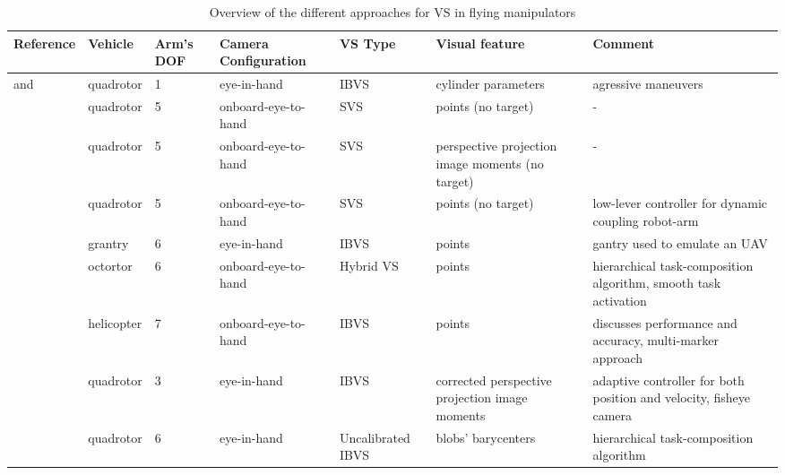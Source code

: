 \renewcommand{\tabularxcolumn}[1]{>{\scriptsize}m{#1}}

\begin{table}
\setlength\extrarowheight{0.3pt} %
	\begin{tabularx}{\textwidth}{CPPBPCC}
		\toprule
		\textbf{Reference} & \textbf{Vehicle} & \textbf{Arm's DOF} & \textbf{Camera Configuration} & \textbf{VS Type} & \textbf{Visual feature} & \textbf{Comment} \\ 
		\midrule
		\cite{thomas_toward_2014} and \cite{thomas_visual_2016} & quadrotor  & 1 & eye-in-hand & IBVS & cylinder parameters & agressive maneuvers \\ 
		\cite{mebarki_image-based_2014} & quadrotor  & 5 & onboard-eye-to-hand  & SVS & points (no target) & - \\ 
		\cite{mebarki_exploiting_2013}  & quadrotor  & 5 & onboard-eye-to-hand  & SVS & perspective projection image moments (no target) & - \\ 
		\cite{mebarki_cross-coupled_2014} & quadrotor  & 5 & onboard-eye-to-hand  & SVS & points (no target) & low-lever controller for dynamic coupling robot-arm \\ 
		\cite{danko_evaluation_2014} & grantry & 6 & eye-in-hand & IBVS & points & gantry used to emulate an UAV \\ 
		\cite{lippiello_hybrid_2016} & octortor & 6 & onboard-eye-to-hand  & Hybrid VS & points & hierarchical task-composition algorithm, smooth task activation \\
		\cite{laiacker_high_2016} & helicopter & 7 & onboard-eye-to-hand  & IBVS & points & discusses performance and accuracy, multi-marker approach \\ 
		\cite{kim_vision-guided_2016} & quadrotor  & 3 & eye-in-hand & IBVS  & corrected perspective projection image moments & adaptive controller for both position and velocity, fisheye camera \\ 
		\cite{santamaria-navarro_uncalibrated_2017} & quadrotor  & 6 & eye-in-hand & Uncalibrated IBVS & blobs' barycenters & hierarchical task-composition algorithm \\
		\bottomrule
	\end{tabularx}
	\caption{Overview of the different approaches for VS in flying manipulators}
	\label{vs-manipulators-table}
\end{table}
